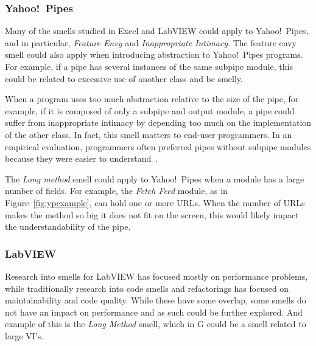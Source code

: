 \documentclass[10pt,conference,compsocconf]{IEEEtran}
\begin{document}
\subsubsection{Yahoo!\ Pipes}
\label{sec:smells:future:yp}
Many of the smells studied in Excel and LabVIEW could apply to Yahoo!\ Pipes, and in particular, \emph{Feature Envy} and \emph{Inappropriate Intimacy}. 
The feature envy smell could also apply when introducing abstraction to Yahoo!\ Pipes programs. For example, if a pipe has several instances of the same subpipe module, this could be related to excessive use of another class and be smelly. 

When a program uses too much abstraction relative to the size of the pipe, for example, if it is composed of only a subpipe and output module, a pipe could suffer from inappropriate intimacy by depending too much on the implementation of the other class. In fact, this smell matters to end-user programmers.  In an empirical evaluation, programmers often preferred pipes without subpipe modules because they were easier to understand~\cite{StoleeTSE2013}. 

The \emph{Long method} smell could apply to Yahoo!\ Pipes when a module has a large number of fields. For example, the \emph{Fetch Feed} module, as in Figure~\ref{fig:ypexample}, can hold one or more URLs. When the number of URLs makes the method so big it does not fit on the screen, this would likely impact the understandability of the pipe. 

\subsubsection{LabVIEW}

Research into smells for LabVIEW has focused mostly on performance problems, while traditionally research into code smells and refactorings has focused on maintainability and code quality.
While these have some overlap, some smells do not have an impact on performance and as such could be further explored. And example of this is the \emph{Long Method} smell, which in G could be a smell related to large VI's.
\end{document}
